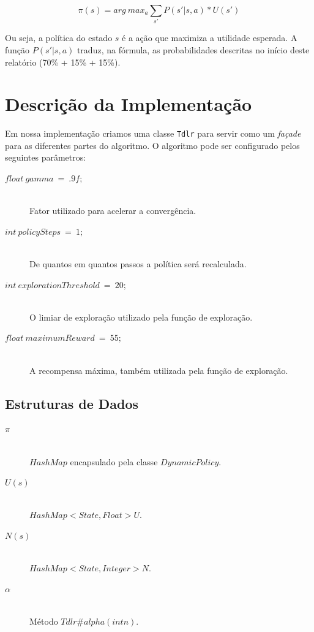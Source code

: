 \documentclass[letterpaper]{article}
\begin{document}
\[\pi(s) = arg\ max_a \sum\limits_{s\prime} P(s\prime|s,a) * U(s\prime)\]

Ou seja, a política do estado $s$ é a ação que maximiza a utilidade esperada. A função $P(s\prime|s,a)$
traduz, na fórmula, as probabilidades descritas no início deste relatório (70\% + 15\% + 15\%).

\section{Descrição da Implementação}

Em nossa implementação criamos uma classe \texttt{Tdlr} para servir como um \textit{façade} para
as diferentes partes do algoritmo. O algoritmo pode ser configurado pelos seguintes parâmetros:

\begin{description}
  \item[$float\ gamma\ =\ .9f;$] \hfill \\
  Fator utilizado para acelerar a convergência.
  \item[$int\ policySteps\ =\ 1;$] \hfill \\
  De quantos em quantos passos a política será recalculada.
  \item[$int\ explorationThreshold\ =\ 20;$] \hfill \\
  O limiar de exploração utilizado pela função de exploração.
  \item[$float\ maximumReward\ =\ 55;$] \hfill \\
  A recompensa máxima, também utilizada pela função de exploração.

\end{description}

\subsection{Estruturas de Dados}

\begin{description}
\item[$\pi$] \hfill \\ $HashMap$ encapsulado pela classe $DynamicPolicy$.
\item[$U(s)$] \hfill \\ $HashMap<State, Float> U$.
\item[$N(s)$] \hfill \\ $HashMap<State, Integer> N$.
\item[$\alpha$] \hfill \\ Método $Tdlr\#alpha(int n)$.
\end{description}
\end{document}
